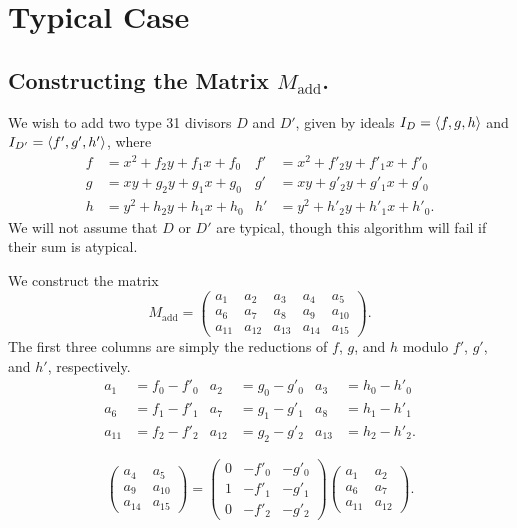 
\section{Typical Case}
\label{chap_typical_case}




\subsection{Constructing the Matrix $M_{\text{add}}$.}

We wish to add two type 31 divisors $D$ and $D'$,
given by ideals $I_D = \left\langle f,g,h \right\rangle$ and $I_{D'} = \left\langle f',g',h' \right\rangle$, where
\begin{align*}
  f &= x^2 + f_2y + f_1x + f_0 & f' &= x^2 + f'_2y + f'_1x + f'_0 \\
  g &=  xy + g_2y + g_1x + g_0 & g' &=  xy + g'_2y + g'_1x + g'_0 \\
  h &= y^2 + h_2y + h_1x + h_0 & h' &= y^2 + h'_2y + h'_1x + h'_0.
\end{align*}
We will not assume that $D$ or $D'$ are typical,
though this algorithm will fail if their sum is atypical.

We construct the matrix 
\[ M_{\text{add}} =
\begin{pmatrix}
  a_1 & a_2 & a_3 & a_4 & a_5 \\
  a_6 & a_7 & a_8 & a_9 & a_{10} \\
  a_{11} & a_{12} & a_{13} & a_{14} & a_{15}
\end{pmatrix}. \]
The first three columns are simply the reductions of $f$, $g$, and $h$ modulo $f'$, $g'$, and $h'$, respectively.
\begin{align*}
  a_1    &= f_0 - f'_0 & a_2    &= g_0 - g'_0 & a_3    &= h_0 - h'_0 \\
  a_6    &= f_1 - f'_1 & a_7    &= g_1 - g'_1 & a_8    &= h_1 - h'_1 \\
  a_{11} &= f_2 - f'_2 & a_{12} &= g_2 - g'_2 & a_{13} &= h_2 - h'_2.
\end{align*}

\[ 
  \begin{pmatrix}
    a_4    & a_5    \\
    a_9    & a_{10} \\
    a_{14} & a_{15}
  \end{pmatrix} = 
  \begin{pmatrix}
    0 & -f'_0 & -g'_0 \\
    1 & -f'_1 & -g'_1 \\
    0 & -f'_2 & -g'_2
  \end{pmatrix}
  \begin{pmatrix}
    a_1    & a_2    \\
    a_6    & a_7    \\
    a_{11} & a_{12}
  \end{pmatrix}.
\]

